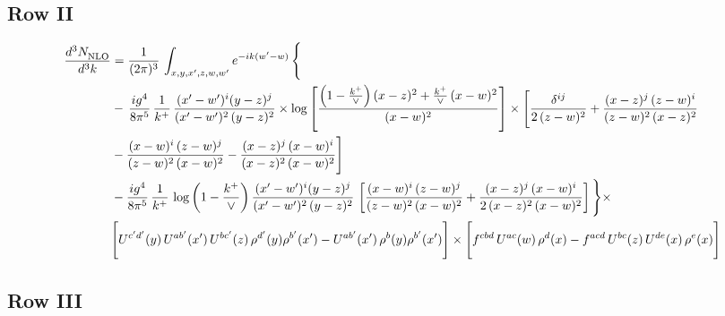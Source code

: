\documentclass[9pt]{article}
\numberwithin{equation}{section}
\begin{document}
\subsection{Row II}
\begin{align}
     \frac{d^{3}N_{\rm NLO}^{\rm}}{d^{3}k}  & =   \frac{1}{(2\pi)^{3}}\, \int_{x,y,x',z,w,w^{\prime}} e^{-ik(w^{\prime}-w)}\, \Bigg\{\notag \\
& -\,\frac{ig^{4}}{8\pi^{5}}\,\frac{1}{k^{+}}\,\frac{(x'-w')^{i}(y-z)^{j}}{(x'-w')^{2}\,(y-z)^{2}}\times \log{\left[\frac{\left(1-\frac{k^{+}}{\vee}\right)(x-z)^{2}+\frac{k^{+}}{\vee}\,(x-w)^{2}}{(x-w)^{2}}\right]}\times \Bigg[\frac{\delta^{ij}}{2\,(z-w)^{2}}+\frac{(x-z)^{j}\,(z-w)^{i}}{(z-w)^{2}\,(x-z)^{2}}\notag \\ & -\frac{(x-w)^{i}\,(z-w)^{j}}{(z-w)^{2}\,(x-w)^{2}}-\frac{(x-z)^{j}\,(x-w)^{i}}{(x-z)^{2}\,(x-w)^{2}}\Bigg] \notag \\
& -\frac{ig^{4}}{8\pi^{5}}\,\frac{1}{k^{+}}\,\log{\left(1-\frac{k^{+}}{\vee}\right)}\,\frac{(x'-w')^{i}(y-z)^{j}}{(x'-w')^{2}\,(y-z)^{2}}\,\left[\frac{(x-w)^{i}\,(z-w)^{j}}{(z-w)^{2}\,(x-w)^{2}}+\frac{(x-z)^{j}\,(x-w)^{i}}{2\,(x-z)^{2}\, (x-w)^{2}}\right]\Bigg\}\times \notag \\ & \Bigg[U^{c'd'}(y)\,U^{ab'}(x')\,U^{bc'}(z)\,\rho^{d'}(y)\rho^{b'}(x')-U^{ab'}(x')\,\rho^{b}(y)\rho^{b'}(x')\Bigg]\times\Bigg[f^{cbd}\,U^{ac}(w)\,\rho^{d}(x)-f^{acd}\, U^{bc}(z)\,U^{de}(x)\,\rho^{e}(x)\Bigg]
\end{align}
 \subsection{Row III}
\end{document}
